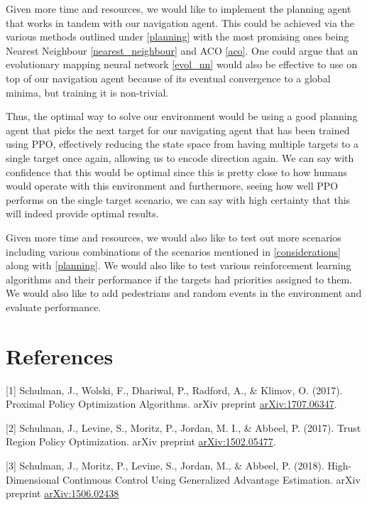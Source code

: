 \documentclass{article}
\begin{document}
    Given more time and resources, we would like to implement the planning agent that works in tandem with our navigation agent. This could be achieved via the various methods outlined under \ref{planning} with the most promising ones being Nearest Neighbour \ref{nearest_neighbour} and ACO \ref{aco}. One could argue that an evolutionary mapping neural network \ref{evol_nn} would also be effective to use on top of our navigation agent because of its eventual convergence to a global minima, but training it is non-trivial.
    
    Thus, the optimal way to solve our environment would be using a good planning agent that picks the next target for our navigating agent that has been trained using PPO, effectively reducing the state space from having multiple targets to a single target once again, allowing us to encode direction again. We can say with confidence that this would be optimal since this is pretty close to how humans would operate with this environment and furthermore, seeing how well PPO performs on the single target scenario, we can say with high certainty that this will indeed provide optimal results.
    
    Given more time and resources, we would also like to test out more scenarios including various combinations of the scenarios mentioned in \ref{considerations} along with \ref{planning}. We would also like to test various reinforcement learning algorithms and their performance if the targets had priorities assigned to them. We would also like to add pedestrians and random events in the environment and evaluate performance.
    
    \section*{References}
    
    
    [1] Schulman, J., Wolski, F., Dhariwal, P., Radford, A., \& Klimov, O. (2017). Proximal Policy Optimization Algorithms. arXiv preprint \href{https://arxiv.org/abs/1707.06347}{arXiv:1707.06347}.
    
    [2] Schulman, J., Levine, S., Moritz, P., Jordan, M. I., \& Abbeel, P. (2017). Trust Region Policy Optimization. arXiv preprint \href{https://arxiv.org/abs/1502.05477}{arXiv:1502.05477}.
    
    [3] Schulman, J., Moritz, P., Levine, S., Jordan, M., \& Abbeel, P. (2018). High-Dimensional Continuous Control Using Generalized Advantage Estimation. arXiv preprint \href{https://arxiv.org/abs/1506.02438}{arXiv:1506.02438}
    
\end{document}
